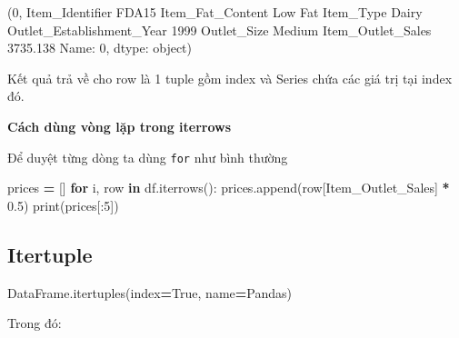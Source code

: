 \documentclass[
]{book}
\newenvironment{Shaded}{\begin{snugshade}}{\end{snugshade}}
\newcommand{\BuiltInTok}[1]{#1}
\newcommand{\ControlFlowTok}[1]{\textcolor[rgb]{0.13,0.29,0.53}{\textbf{#1}}}
\newcommand{\DecValTok}[1]{\textcolor[rgb]{0.00,0.00,0.81}{#1}}
\newcommand{\FloatTok}[1]{\textcolor[rgb]{0.00,0.00,0.81}{#1}}
\newcommand{\KeywordTok}[1]{\textcolor[rgb]{0.13,0.29,0.53}{\textbf{#1}}}
\newcommand{\NormalTok}[1]{#1}
\newcommand{\OperatorTok}[1]{\textcolor[rgb]{0.81,0.36,0.00}{\textbf{#1}}}
\newcommand{\StringTok}[1]{\textcolor[rgb]{0.31,0.60,0.02}{#1}}
\newcommand{\VariableTok}[1]{\textcolor[rgb]{0.00,0.00,0.00}{#1}}
\begin{document}
\begin{Shaded}
\begin{Highlighting}[]
\NormalTok{(0,}
\NormalTok{ Item\_Identifier                 FDA15}
\NormalTok{ Item\_Fat\_Content              Low Fat}
\NormalTok{ Item\_Type                       Dairy}
\NormalTok{ Outlet\_Establishment\_Year        1999}
\NormalTok{ Outlet\_Size                    Medium}
\NormalTok{ Item\_Outlet\_Sales            3735.138}
\NormalTok{ Name: 0, dtype: object)}
\end{Highlighting}
\end{Shaded}

Kết quả trả về cho row là 1 tuple gồm index và Series chứa các giá trị tại index đó.

\textbf{Cách dùng vòng lặp trong iterrows}

Để duyệt từng dòng ta dùng \texttt{for} như bình thường

\begin{Shaded}
\begin{Highlighting}[]
\NormalTok{prices }\OperatorTok{=}\NormalTok{ []}
\ControlFlowTok{for}\NormalTok{ i, row }\KeywordTok{in}\NormalTok{ df.iterrows():}
\NormalTok{    prices.append(row[}\StringTok{\textquotesingle{}Item\_Outlet\_Sales\textquotesingle{}}\NormalTok{] }\OperatorTok{*} \FloatTok{0.5}\NormalTok{)}
\BuiltInTok{print}\NormalTok{(prices[:}\DecValTok{5}\NormalTok{])}
\end{Highlighting}
\end{Shaded}

\begin{Shaded}
\begin{Highlighting}[]
\NormalTok{[1867.569, 221.7114, 1048.635, 366.19, 497.3526]}
\end{Highlighting}
\end{Shaded}

\subsection{Itertuple}\label{itertuple}

\begin{Shaded}
\begin{Highlighting}[]
\NormalTok{DataFrame.itertuples(index}\OperatorTok{=}\VariableTok{True}\NormalTok{, name}\OperatorTok{=}\StringTok{\textquotesingle{}Pandas\textquotesingle{}}\NormalTok{)}
\end{Highlighting}
\end{Shaded}

Trong đó:
\end{document}
